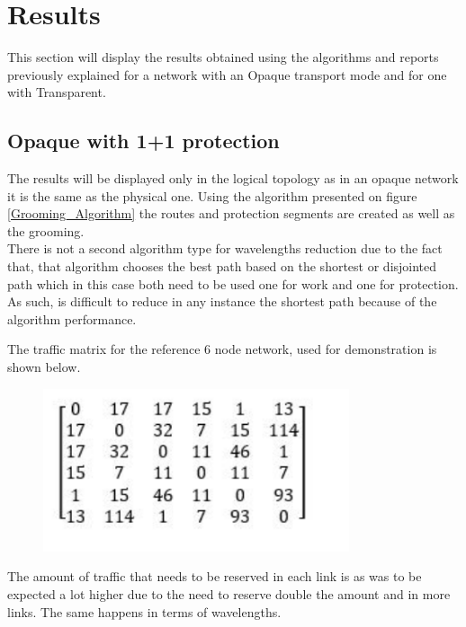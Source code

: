 	\section*{Results}
	This section will display the results obtained using the algorithms and reports previously explained for a network with an Opaque transport mode and for one with Transparent.

	
	\subsection*{Opaque with 1+1 protection}
	
	The results will be displayed only in the logical topology as in an opaque network it is the same as the physical one.
	Using the algorithm presented on figure \ref{Grooming_Algorithm} the routes and protection segments are created as well as the grooming. \\
	
	There is not a second algorithm type for wavelengths reduction due to the fact that, that algorithm chooses the best path based on the shortest or disjointed path which in this case both need to be used one for work and one for protection. As such, is difficult to reduce in any instance the shortest path because of the algorithm performance.
	
	The traffic matrix for the reference 6 node network, used for demonstration is shown below.
	
	\begin{figure}[h!]
		\centering
		\includegraphics[width=9cm]{opaqueLineMatricesLogical11.pdf}	
		\caption{}
		\label{opaqueLineMatricesLogical11}								
	\end{figure}	
	
	The amount of traffic that needs to be reserved in each link is as was to be expected a lot higher due to the need to reserve double the amount and in more links. The same happens in terms of wavelengths. \\
	
